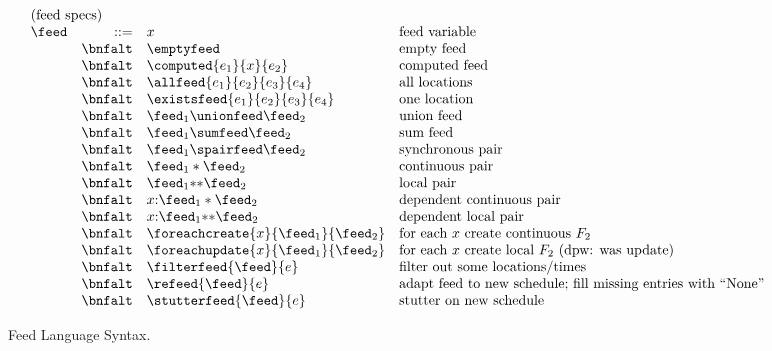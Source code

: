 \begin{figure*}[t]
\[
\begin{array}{lrll}
\multicolumn{4}{l}{\mbox{(feed specs)}}\\ 
\feed & ::=     & x &  \mbox{feed variable} \\
 & \bnfalt & \emptyfeed & \mbox{empty feed} \\
 & \bnfalt & \computed{e_1}{x}{e_2} & \mbox{computed feed} \\
 & \bnfalt & \allfeed{e_1}{e_2}{e_3}{e_4} & \mbox{all locations} \\
 & \bnfalt & \existsfeed{e_1}{e_2}{e_3}{e_4} & \mbox{one location} \\
 & \bnfalt & \feed_1 \unionfeed \feed_2 & \mbox{union feed} \\
 & \bnfalt & \feed_1 \sumfeed \feed_2 & \mbox{sum feed} \\
 & \bnfalt & \feed_1 \spairfeed \feed_2 & \mbox{synchronous pair} \\
 & \bnfalt & \feed_1 * \feed_2 & \mbox{continuous pair} \\
 & \bnfalt & \feed_1 {*}{*} \feed_2 & \mbox{local pair} \\
 & \bnfalt & x{:}\feed_1 * \feed_2 & \mbox{dependent continuous pair} \\
 & \bnfalt & x{:}\feed_1 {*}{*} \feed_2 & \mbox{dependent local pair} \\
 & \bnfalt & \foreachcreate{x}{\feed_1}{\feed_2} & \mbox{for each $x$ create continuous $F_2$} \\
 & \bnfalt & \foreachupdate{x}{\feed_1}{\feed_2} & \mbox{for each $x$ create local $F_2$ (dpw: was update)} \\
 & \bnfalt & \filterfeed{\feed}{e} & \mbox{filter out some locations/times} \\
 & \bnfalt & \refeed{\feed}{e} & \mbox{adapt feed to new schedule; 
                                               fill missing entries with ``None''} \\
 & \bnfalt & \stutterfeed{\feed}{e} & \mbox{stutter on new schedule} \\

\end{array}
\]
\caption{Feed Language Syntax.}
\label{fig:syntax}
\end{figure*}


